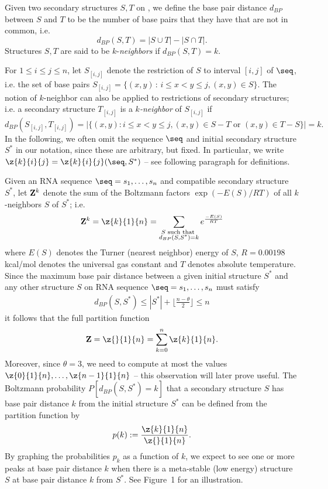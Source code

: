 Given two secondary structures $S,T$ on \seq, we
define the base pair distance $d_{BP}$ between $S$ and $T$
to be the number of base pairs that they have that are not in
common, i.e.
\begin{equation}
d_{BP}(S,T) = |S \cup T| - |S \cap T|.
\end{equation}
Structures $S,T$ are said to be $k$-{\em neighbors} if $d_{BP}(S,T) = k$.


For $1\leq i \leq j \leq n$, let
$S_{[i,j]}$ denote the restriction of $S$ to interval
$[i,j]$ of $\seq$, i.e. the set of base pairs
%
$S_{[i,j]} = \{ (x,y) \,:\, i \leq  x < y \leq j,  (x,y) \in S \}$.
%
The notion of $k$-neighbor can also be applied to restrictions of secondary
structures; i.e. a secondary structure $T_{[i,j]}$ is a
{\em $k$-neighbor} of $S_{[i,j]}$ if
\[
d_{BP}(S_{[i,j]},T_{[i,j]})= |\{ (x,y): i \leq x<y\leq j,
(x,y) \in S-T \mbox{ or } (x,y) \in T-S \}| = k.
\]
In the following,
we often omit the sequence $\seq$ and initial secondary structure $S^*$ in our
notation, since these are arbitrary, but fixed.
In particular, we write $\z{k}{i}{j} = \z{k}{i}{j}(\seq,S^*)$ --
see following paragraph for definitions.


Given an RNA sequence $\seq=s_1,\ldots,s_n$ and compatible secondary structure
$S^*$, let ${\bf Z}^k$ denote the sum
of the Boltzmann factors $\exp(-E(S)/RT)$ of all $k$-neighbors $S$ of  $S^*$;
i.e.
\[
{\bf Z}^k = \z{k}{1}{n} =
\sum_{\substack{S \text{ such that }\\ d_{BP}(S,S^*)=k}}
e^{\frac{-E(S)}{RT}}
\]
where $E(S)$ denotes the Turner (nearest neighbor)
energy \cite{turner,xia:RNA}
of $S$, $R = 0.00198$ kcal/mol denotes the universal
gas constant and $T$ denotes absolute temperature.
Since the maximum base pair distance between a given initial
structure $S^*$ and any other structure $S$ on RNA sequence
$\seq = s_1,\ldots,s_n$ must satisfy
\begin{eqnarray}
\label{eq:upperBound}
d_{BP}(S,S^*) \leq |S^*| + \lfloor \frac{n-\theta}{2} \rfloor \leq n
\end{eqnarray}
it follows that the full partition function
\begin{eqnarray}
\label{eq:mcCaskillPartitionFun}
{\bf Z}=\z{}{1}{n} = \sum_{k=0}^n \z{k}{1}{n}.
\end{eqnarray}
Moreover, since $\theta=3$,
we need to compute at most the values
$\z{0}{1}{n},\ldots,\z{n-1}{1}{n}$ -- this observation will later prove useful.
The Boltzmann probability
$P[d_{BP}(S,S^*) = k]$
that a secondary structure $S$ has base pair distance $k$ from the initial
structure $S^*$ can be defined from the partition function by
\[
p(k) :=\frac{\z{k}{1}{n}}{\z{}{1}{n}}.
\]
By graphing the probabilities $p_k$ as a function of $k$,
we expect to see one or more peaks at base pair distance $k$ when
there is a meta-stable (low energy) structure $S$
at base pair distance $k$ from $S^*$.
See Figure~1 for an illustration.

